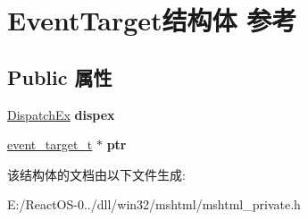 \hypertarget{struct_event_target}{}\section{Event\+Target结构体 参考}
\label{struct_event_target}
\subsection*{Public 属性}
\begin{DoxyCompactItemize}
\item 
\mbox{\label{struct_event_target_ad76b912eedb6f6658071d41b86cb71e6}} 
\hyperlink{struct_dispatch_ex}{Dispatch\+Ex} {\bfseries dispex}
\item 
\mbox{\label{struct_event_target_a0bfb75d6a3050e7a1957b5bb0534785f}} 
\hyperlink{structevent__target__t}{event\+\_\+target\+\_\+t} $\ast$ {\bfseries ptr}
\end{DoxyCompactItemize}


该结构体的文档由以下文件生成\+:\begin{DoxyCompactItemize}
\item 
E\+:/\+React\+O\+S-\/0../dll/win32/mshtml/mshtml\+\_\+private.\+h\end{DoxyCompactItemize}
